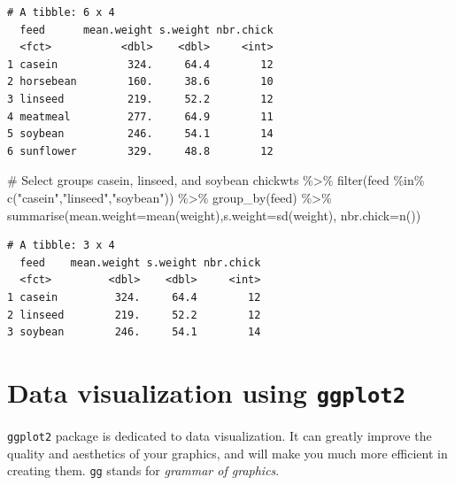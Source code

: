 \documentclass[
  letterpaper,
  DIV=11,
  numbers=noendperiod]{scrreprt}
\newenvironment{Shaded}{\begin{snugshade}}{\end{snugshade}}
\newcommand{\AttributeTok}[1]{\textcolor[rgb]{0.40,0.45,0.13}{#1}}
\newcommand{\CommentTok}[1]{\textcolor[rgb]{0.37,0.37,0.37}{#1}}
\newcommand{\FunctionTok}[1]{\textcolor[rgb]{0.28,0.35,0.67}{#1}}
\newcommand{\NormalTok}[1]{\textcolor[rgb]{0.00,0.23,0.31}{#1}}
\newcommand{\SpecialCharTok}[1]{\textcolor[rgb]{0.37,0.37,0.37}{#1}}
\newcommand{\StringTok}[1]{\textcolor[rgb]{0.13,0.47,0.30}{#1}}
\begin{document}
\begin{verbatim}
# A tibble: 6 x 4
  feed      mean.weight s.weight nbr.chick
  <fct>           <dbl>    <dbl>     <int>
1 casein           324.     64.4        12
2 horsebean        160.     38.6        10
3 linseed          219.     52.2        12
4 meatmeal         277.     64.9        11
5 soybean          246.     54.1        14
6 sunflower        329.     48.8        12
\end{verbatim}

\begin{Shaded}
\begin{Highlighting}[]
\CommentTok{\# Select groups \textasciigrave{}casein\textasciigrave{}, \textasciigrave{}linseed\textasciigrave{}, and \textasciigrave{}soybean\textasciigrave{}}
\NormalTok{chickwts }\SpecialCharTok{\%\textgreater{}\%} 
  \FunctionTok{filter}\NormalTok{(feed }\SpecialCharTok{\%in\%} \FunctionTok{c}\NormalTok{(}\StringTok{"casein"}\NormalTok{,}\StringTok{"linseed"}\NormalTok{,}\StringTok{"soybean"}\NormalTok{)) }\SpecialCharTok{\%\textgreater{}\%} 
  \FunctionTok{group\_by}\NormalTok{(feed) }\SpecialCharTok{\%\textgreater{}\%} 
  \FunctionTok{summarise}\NormalTok{(}\AttributeTok{mean.weight=}\FunctionTok{mean}\NormalTok{(weight),}\AttributeTok{s.weight=}\FunctionTok{sd}\NormalTok{(weight), }\AttributeTok{nbr.chick=}\FunctionTok{n}\NormalTok{())}
\end{Highlighting}
\end{Shaded}

\begin{verbatim}
# A tibble: 3 x 4
  feed    mean.weight s.weight nbr.chick
  <fct>         <dbl>    <dbl>     <int>
1 casein         324.     64.4        12
2 linseed        219.     52.2        12
3 soybean        246.     54.1        14
\end{verbatim}

\hypertarget{data-visualization-using-ggplot2}{%
\section*{\texorpdfstring{Data visualization using
\texttt{ggplot2}}{Data visualization using ggplot2}}\label{data-visualization-using-ggplot2}}


\texttt{ggplot2} package is dedicated to data visualization. It can
greatly improve the quality and aesthetics of your graphics, and will
make you much more efficient in creating them. \texttt{gg} stands for
\emph{grammar of graphics}.
\end{document}

